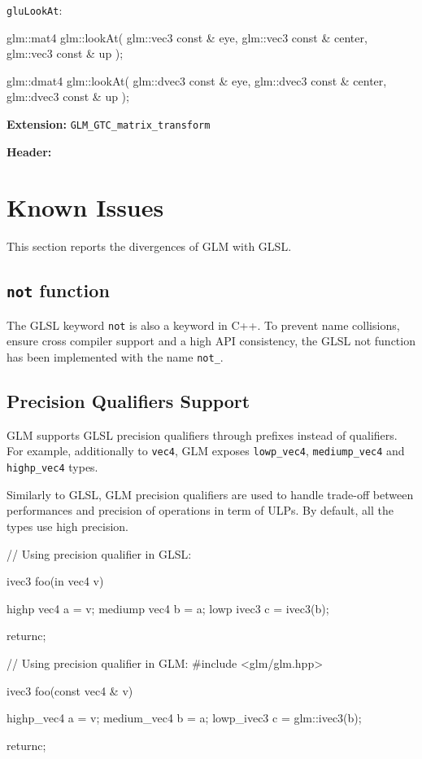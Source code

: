 \documentclass{scrartcl}
\numberwithin{figure}{subsection}
\begin{document}
\verb|gluLookAt|:

\begin{cppcode}
glm::mat4 glm::lookAt(
  glm::vec3 const & eye,
  glm::vec3 const & center,
  glm::vec3 const & up
);

glm::dmat4 glm::lookAt(
  glm::dvec3 const & eye,
  glm::dvec3 const & center,
  glm::dvec3 const & up
);
\end{cppcode}

\textbf{Extension:} \verb|GLM_GTC_matrix_transform|

\textbf{Header:} 
 


\section{Known Issues}
This section reports the divergences of GLM with GLSL.

\subsection{\texttt{not} function}

The GLSL keyword \verb|not| is also a keyword in C++. To prevent name collisions, ensure cross compiler support and a high API consistency, the GLSL not function has been implemented with the name \verb|not_|.

\subsection{Precision Qualifiers Support}

GLM supports GLSL precision qualifiers through prefixes instead of qualifiers. For example, additionally to \verb|vec4|, GLM exposes \verb|lowp_vec4|, \verb|mediump_vec4| and \verb|highp_vec4| types.

Similarly to GLSL, GLM precision qualifiers are used to handle trade-off between performances and precision of operations in term of ULPs. 
By default, all the types use high precision.

\begin{glslcode}
// Using precision qualifier in GLSL:

ivec3 foo(in vec4 v)
{
  highp vec4 a = v;
  mediump vec4 b = a;
  lowp ivec3 c = ivec3(b);

  returnc;
}
\end{glslcode}

\begin{cppcode}
// Using precision qualifier in GLM:
#include <glm/glm.hpp>

ivec3 foo(const vec4 & v)
{
  highp_vec4 a = v;
  medium_vec4 b = a;
  lowp_ivec3 c = glm::ivec3(b);

  returnc;
}
\end{cppcode}
\end{document}
